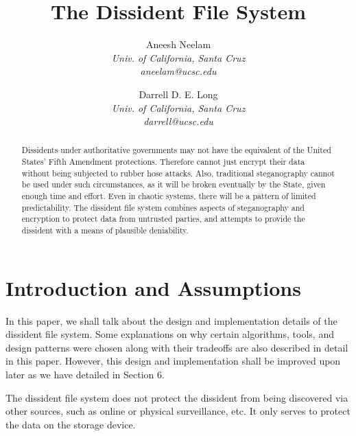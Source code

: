 \documentclass[10pt,onecolumn]{article}
\begin{document}
\title{The Dissident File System}

\author{
Aneesh Neelam \\
\textit{Univ. of California, Santa Cruz} \\
\textit{aneelam@ucsc.edu}
\and
Darrell D. E. Long \\
\textit{Univ. of California, Santa Cruz} \\
\textit{darrell@ucsc.edu}
}

\maketitle
\thispagestyle{empty}

\begin{abstract}

Dissidents under authoritative governments may not have the equivalent of the United States' Fifth Amendment protections. Therefore cannot just encrypt their data without being subjected to rubber hose attacks. Also, traditional steganography cannot be used under such circumstances, as it will be broken eventually by the State, given enough time and effort. Even in chaotic systems, there will be a pattern of limited predictability.  The dissident file system combines aspects of steganography and encryption to protect data from untrusted parties, and attempts to provide the dissident with a means of plausible deniability. 

\end{abstract}

\section{Introduction and Assumptions}

In this paper, we shall talk about the design and implementation details of the dissident file system. Some explanations on why certain algorithms, tools, and design patterns were chosen along with their tradeoffs are also described in detail in this paper. However, this design and implementation shall be improved upon later as we have detailed in Section 6. 

The dissident file system does not protect the dissident from being discovered via other sources, such as online or physical surveillance, etc. It only serves to protect the data on the storage device. 

\end{document}
